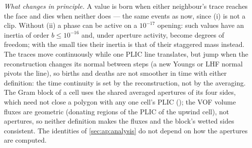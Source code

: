 \emph{What changes in principle.}  A value is born when either neighbour's trace reaches the face
and dies when neither does --- the same events as now, since (i) is not a clip.  Without (ii) a
phase can be active on a $10^{-17}$ opening: such values have an inertia of order $b\le10^{-16}$
and, under aperture activity, become degrees of freedom; with the small ties their inertia is
that of their staggered mass instead.  The traces move continuously while one PLIC line
translates, but jump when the reconstruction changes its normal between steps (a new Youngs or
LHF normal pivots the line), so births and deaths are not smoother in time with either
definition: the time continuity is set by the reconstruction, not by the averaging.  The Gram
block of a cell uses the shared averaged apertures of its four sides, which need not close a
polygon with any one cell's PLIC (); the VOF volume fluxes are geometric
(donating regions of the PLIC of the upwind cell), not apertures, so neither definition makes the
fluxes and the block's wetted sides consistent.  The identities of \cref{sec:ap:analysis} do not
depend on how the apertures are computed.
